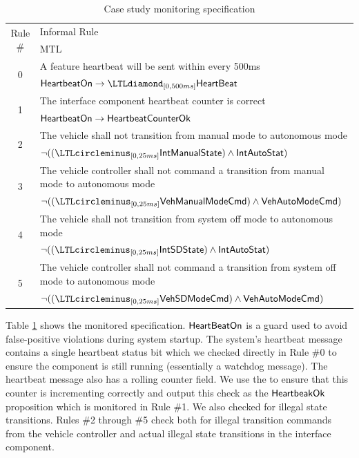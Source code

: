 \begin{table}[t]
\centering
\footnotesize
\begin{tabular}{|c|p{4.3in}|}
\hline \multirow{2}{*}{Rule \#} & Informal Rule \\ & MTL \\
\hline \multirow{2}{*}{0} & A feature heartbeat will be sent within every 500ms \\
& $\pred{HeartbeatOn} \rightarrow \LTLdiamond_{[0,500ms]} \pred{HeartBeat}$ \\
\hline \multirow{2}{*}{1} & The interface component heartbeat counter is correct \\
& $\mathsf{HeartbeatOn} \rightarrow \mathsf{HeartbeatCounterOk}$ \\
\hline \multirow{2}{*}{2} & The vehicle shall not transition from manual mode to autonomous mode \\
&  $\neg ((\LTLcircleminus_{[0,25ms]} \pred{IntManualState}) \wedge \pred{IntAutoStat})$\\
\hline \multirow{2}{*}{3} & The vehicle controller shall not command a transition from manual mode to autonomous mode \\
& $\neg ((\LTLcircleminus_{[0,25ms]} \pred{VehManualModeCmd}) \wedge \pred{VehAutoModeCmd})$\\
\hline \multirow{2}{*}{4} & The vehicle shall not transition from system off mode to autonomous mode \\
&  $\neg ((\LTLcircleminus_{[0,25ms]} \pred{IntSDState}) \wedge \pred{IntAutoStat})$\\
\hline \multirow{2}{*}{5} & The vehicle controller shall not command a transition from system off mode to autonomous mode \\
& $\neg ((\LTLcircleminus_{[0,25ms]} \pred{VehSDModeCmd}) \wedge \pred{VehAutoModeCmd})$\\
\hline
\end{tabular}
\caption{Case study monitoring specification \label{tab:monspec}}
\end{table}

Table \ref{tab:monspec} shows the monitored specification. 
$\mathsf{HeartBeatOn}$ is a guard used to avoid false-positive violations during system startup. 
The system's heartbeat message contains a single heartbeat status bit which we checked directly in Rule \#0 to ensure the component is still running (essentially a watchdog message).
The heartbeat message also has a rolling counter field.
We use the \sfmap to ensure that this counter is incrementing correctly and output this check as the $\mathsf{HeartbeakOk}$ proposition which is monitored in Rule \#1.
We also checked for illegal state transitions. Rules \#2 through \#5 check both for illegal transition commands from the vehicle controller and actual illegal state transitions in the interface component.

